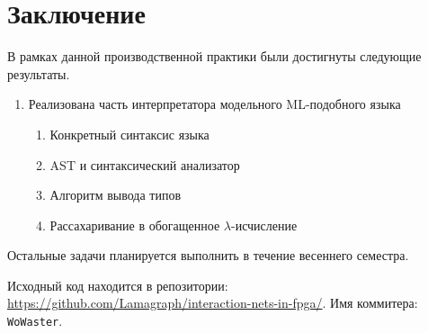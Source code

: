 
\section*{Заключение}

В рамках данной производственной практики были достигнуты следующие результаты.
\begin{enumerate}
    \item Реализована часть интерпретатора модельного ML-подобного языка
          \begin{enumerate}
              \item Конкретный синтаксис языка
              \item AST и синтаксический анализатор
              \item Алгоритм вывода типов
              \item Рассахаривание в обогащенное $\lambda$-исчисление
          \end{enumerate}
\end{enumerate}

Остальные задачи планируется выполнить в течение весеннего семестра.

Исходный код находится в репозитории: \url{https://github.com/Lamagraph/interaction-nets-in-fpga/}.
Имя коммитера: \texttt{WoWaster}.
